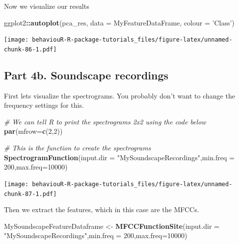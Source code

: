 \documentclass[]{book}
\newenvironment{Shaded}{\begin{snugshade}}{\end{snugshade}}
\newcommand{\CommentTok}[1]{\textcolor[rgb]{0.56,0.35,0.01}{\textit{#1}}}
\newcommand{\DataTypeTok}[1]{\textcolor[rgb]{0.13,0.29,0.53}{#1}}
\newcommand{\DecValTok}[1]{\textcolor[rgb]{0.00,0.00,0.81}{#1}}
\newcommand{\KeywordTok}[1]{\textcolor[rgb]{0.13,0.29,0.53}{\textbf{#1}}}
\newcommand{\NormalTok}[1]{#1}
\newcommand{\OperatorTok}[1]{\textcolor[rgb]{0.81,0.36,0.00}{\textbf{#1}}}
\newcommand{\StringTok}[1]{\textcolor[rgb]{0.31,0.60,0.02}{#1}}
\begin{document}
Now we visualize our results

\begin{Shaded}
\begin{Highlighting}[]
\NormalTok{ggplot2}\OperatorTok{::}\KeywordTok{autoplot}\NormalTok{(pca_res, }\DataTypeTok{data =}\NormalTok{ MyFeatureDataFrame,}
         \DataTypeTok{colour =} \StringTok{'Class'}\NormalTok{)}
\end{Highlighting}
\end{Shaded}

\texttt{[image: behaviouR-R-package-tutorials\_files/figure-latex/unnamed-chunk-86-1.pdf]}

\hypertarget{part-4b.-soundscape-recordings}{%
\subsection{Part 4b. Soundscape recordings}\label{part-4b.-soundscape-recordings}}

First lets visualize the spectrograms. You probably don't want to change the frequency settings for this.

\begin{Shaded}
\begin{Highlighting}[]
\CommentTok{# We can tell R to print the spectrograms 2x2 using the code below}
\KeywordTok{par}\NormalTok{(}\DataTypeTok{mfrow=}\KeywordTok{c}\NormalTok{(}\DecValTok{2}\NormalTok{,}\DecValTok{2}\NormalTok{))}

\CommentTok{# This is the function to create the spectrograms}
\KeywordTok{SpectrogramFunction}\NormalTok{(}\DataTypeTok{input.dir =} \StringTok{"MySoundscapeRecordings"}\NormalTok{,}\DataTypeTok{min.freq =} \DecValTok{200}\NormalTok{,}\DataTypeTok{max.freq=}\DecValTok{10000}\NormalTok{)}
\end{Highlighting}
\end{Shaded}

\texttt{[image: behaviouR-R-package-tutorials\_files/figure-latex/unnamed-chunk-87-1.pdf]}

Then we extract the features, which in this case are the MFCCs.

\begin{Shaded}
\begin{Highlighting}[]
\NormalTok{MySoundscapeFeatureDataframe <-}\StringTok{ }
\StringTok{  }\KeywordTok{MFCCFunctionSite}\NormalTok{(}\DataTypeTok{input.dir =} \StringTok{"MySoundscapeRecordings"}\NormalTok{,}\DataTypeTok{min.freq =} \DecValTok{200}\NormalTok{,}\DataTypeTok{max.freq=}\DecValTok{10000}\NormalTok{)}
\end{Highlighting}
\end{Shaded}
\end{document}
